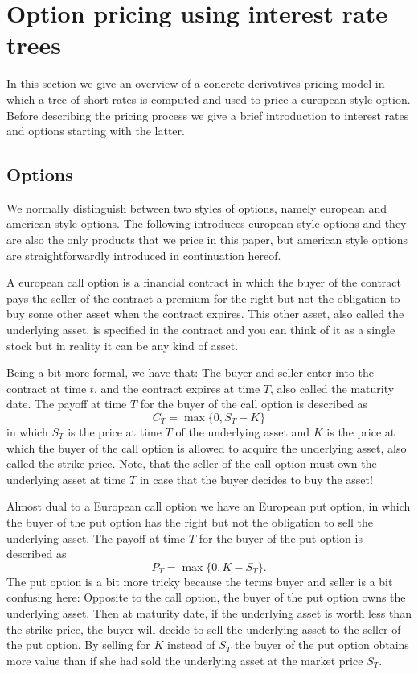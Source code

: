 \section{Option pricing using interest rate trees}

In this section we give an overview of a concrete
derivatives pricing model \cite{HullWhite94} in which a tree
of short rates is computed and used to price a european
style option. Before describing the pricing process we give
a brief introduction to interest rates and options starting
with the latter.

\subsection{Options}

We normally distinguish between two styles of options,
namely european and american style options. The following
introduces european style options and they are also the only
products that we price in this paper, but american style
options are straightforwardly introduced in continuation
hereof.

A european call option is a financial contract in which the
buyer of the contract pays the seller of the contract a
premium for the right but not the obligation to buy some
other asset when the contract expires. This other asset,
also called the underlying asset, is specified in the
contract and you can think of it as a single stock but in
reality it can be any kind of asset.

Being a bit more formal, we have that: The buyer and seller
enter into the contract at time $t$, and the contract
expires at time $T$, also called the maturity date. The
payoff at time $T$ for the buyer of the call option is
described as
%
\begin{equation}
  C_T = \operatorname{max}\{0, S_T-K\}
\end{equation}
%
in which $S_T$ is the price at time $T$ of the underlying
asset and $K$ is the price at which the buyer of the call
option is allowed to acquire the underlying asset, also
called the strike price. Note, that the seller of the call
option must own the underlying asset at time $T$ in case
that the buyer decides to buy the asset!

Almost dual to a European call option we have an European
put option, in which the buyer of the put option has the
right but not the obligation to sell the underlying
asset. The payoff at time $T$ for the buyer of the put
option is described as
%
\begin{equation}
  P_T = \operatorname{max}\{0, K-S_T\} .
\end{equation}
%
The put option is a bit more tricky because the terms buyer
and seller is a bit confusing here: Opposite to the call
option, the buyer of the put option owns the underlying
asset. Then at maturity date, if the underlying asset is
worth less than the strike price, the buyer will decide to
sell the underlying asset to the seller of the put
option. By selling for $K$ instead of $S_T$ the buyer of the
put option obtains more value than if she had sold the
underlying asset at the market price $S_T$.

